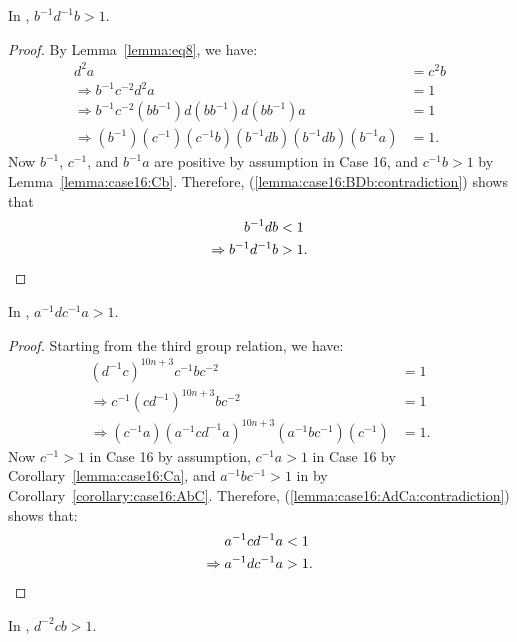 \begin{lemma} In , $b^{-1}d^{-1}b>1$.
\label{lemma:case16:BDb}
\end{lemma}
\begin{proof} By Lemma~\ref{lemma:eq8}, we have:
\begin{align}
d^{2}a&=c^{2}b\nonumber{}\\
\Rightarrow{}b^{-1}c^{-2}d^{2}a&=1\nonumber{}\\
\Rightarrow{}b^{-1}c^{-2}(bb^{-1})d(bb^{-1})d(bb^{-1})a&=1\nonumber{}\\
\Rightarrow{}(b^{-1})(c^{-1})(c^{-1}b)(b^{-1}db)(b^{-1}db)(b^{-1}a)&=1.\label{lemma:case16:BDb:contradiction}
\end{align}
Now $b^{-1}$, $c^{-1}$, and $b^{-1}a$ are positive by assumption in Case 16, and $c^{-1}b>1$ by Lemma~\ref{lemma:case16:Cb}. Therefore, (\ref{lemma:case16:BDb:contradiction}) shows that
\begin{align*}
b^{-1}db&<1\\
\Rightarrow{}b^{-1}d^{-1}b&>1.\qedhere
\end{align*}
\end{proof}

\begin{lemma} In , $a^{-1}dc^{-1}a>1$.
\label{lemma:case16:AdCa}
\end{lemma}

\begin{proof} Starting from the third group relation, we have:
\begin{align}
(d^{-1}c)^{10n+3}c^{-1}bc^{-2}&=1\nonumber{}\\
\Rightarrow{}c^{-1}(cd^{-1})^{10n+3}bc^{-2}&=1\nonumber{}\\
\Rightarrow{}(c^{-1}a)(a^{-1}cd^{-1}a)^{10n+3}(a^{-1}bc^{-1})(c^{-1})&=1.\label{lemma:case16:AdCa:contradiction}
\end{align}
Now $c^{-1}>1$ in Case 16 by assumption, $c^{-1}a>1$ in Case 16 by Corollary~\ref{lemma:case16:Ca}, and $a^{-1}bc^{-1}>1$ in  by Corollary~\ref{corollary:case16:AbC}. Therefore, (\ref{lemma:case16:AdCa:contradiction}) shows that:
\begin{align*}
a^{-1}cd^{-1}a&<1\\
\Rightarrow{}a^{-1}dc^{-1}a&>1.\qedhere
\end{align*}
\end{proof}

\begin{lemma} In , $d^{-2}cb>1$.
\label{lemma:case16:DDcb}
\end{lemma}

